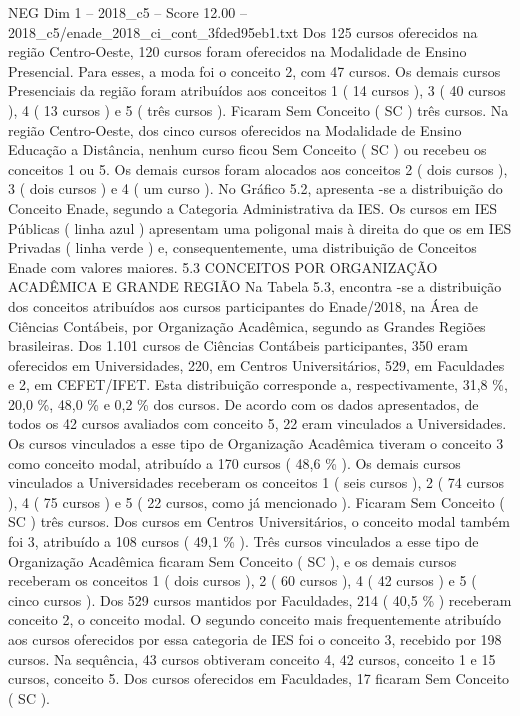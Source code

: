 \begin{textsample}{NEG Dim 1 – 2018\_c5 – Score 12.00 – 2018\_c5/enade\_2018\_ci\_cont\_3fded95eb1.txt}
Dos 125 cursos oferecidos na região Centro-Oeste, 120 cursos foram oferecidos na Modalidade de Ensino Presencial.
Para esses, a moda foi o conceito 2, com 47 cursos.
Os demais cursos Presenciais da região foram atribuídos aos conceitos 1 ( 14 cursos ), 3 ( 40 cursos ), 4 ( 13 cursos ) e 5 ( três cursos ).
Ficaram Sem Conceito ( SC ) três cursos.
Na região Centro-Oeste, dos cinco cursos oferecidos na Modalidade de Ensino Educação a Distância, nenhum curso ficou Sem Conceito ( SC ) ou recebeu os conceitos 1 ou 5.
Os demais cursos foram alocados aos conceitos 2 ( dois cursos ), 3 ( dois cursos ) e 4 ( um curso ).
No Gráfico 5.2, apresenta -se a distribuição do Conceito Enade, segundo a Categoria Administrativa da IES.
Os cursos em IES Públicas ( linha azul ) apresentam uma poligonal mais à direita do que os em IES Privadas ( linha verde ) e, consequentemente, uma distribuição de Conceitos Enade com valores maiores. 5.3 CONCEITOS POR ORGANIZAÇÃO ACADÊMICA E GRANDE REGIÃO Na Tabela 5.3, encontra -se a distribuição dos conceitos atribuídos aos cursos participantes do Enade/2018, na Área de Ciências Contábeis, por Organização Acadêmica, segundo as Grandes Regiões brasileiras.
Dos 1.101 cursos de Ciências Contábeis participantes, 350 eram oferecidos em Universidades, 220, em Centros Universitários, 529, em Faculdades e 2, em CEFET/IFET.
Esta distribuição corresponde a, respectivamente, 31,8 \%, 20,0 \%, 48,0 \% e 0,2 \% dos cursos.
De acordo com os dados apresentados, de todos os 42 cursos avaliados com conceito 5, 22 eram vinculados a Universidades.
Os cursos vinculados a esse tipo de Organização Acadêmica tiveram o conceito 3 como conceito modal, atribuído a 170 cursos ( 48,6 \% ).
Os demais cursos vinculados a Universidades receberam os conceitos 1 ( seis cursos ), 2 ( 74 cursos ), 4 ( 75 cursos ) e 5 ( 22 cursos, como já mencionado ).
Ficaram Sem Conceito ( SC ) três cursos.
Dos cursos em Centros Universitários, o conceito modal também foi 3, atribuído a 108 cursos ( 49,1 \% ).
Três cursos vinculados a esse tipo de Organização Acadêmica ficaram Sem Conceito ( SC ), e os demais cursos receberam os conceitos 1 ( dois cursos ), 2 ( 60 cursos ), 4 ( 42 cursos ) e 5 ( cinco cursos ).
Dos 529 cursos mantidos por Faculdades, 214 ( 40,5 \% ) receberam conceito 2, o conceito modal.
O segundo conceito mais frequentemente atribuído aos cursos oferecidos por essa categoria de IES foi o conceito 3, recebido por 198 cursos.
Na sequência, 43 cursos obtiveram conceito 4, 42 cursos, conceito 1 e 15 cursos, conceito 5.
Dos cursos oferecidos em Faculdades, 17 ficaram Sem Conceito ( SC ).

\end{textsample}
